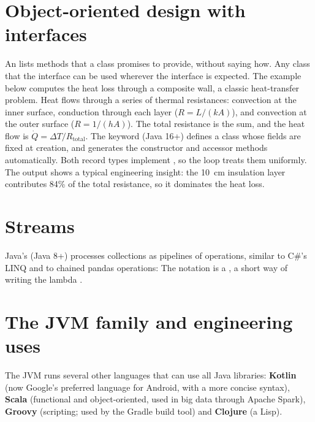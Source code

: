 \section{Object-oriented design with interfaces}

An  lists methods that a class promises to provide, without saying how.
Any class that  the interface can be used wherever the interface is
expected. The example below computes the heat loss through a composite wall, a classic
heat-transfer problem. Heat flows through a series of thermal resistances: convection at
the inner surface, conduction through each layer ($R = L/(kA)$), and convection at the
outer surface ($R = 1/(hA)$). The total resistance is the sum, and the heat flow is
$\dot Q = \Delta T / R_\mathrm{total}$.
The  keyword (Java 16+) defines a class whose fields are fixed at creation,
and generates the constructor and accessor methods automatically. Both record types
implement , so the loop treats them uniformly. The output shows a
typical engineering insight: the 10~cm insulation layer contributes 84\% of the total
resistance, so it dominates the heat loss.

\section{Streams}

Java's  (Java 8+) processes collections as pipelines of operations,
similar to C\#'s LINQ and to chained pandas operations:
The notation  is a , a short way of
writing the lambda .

\section{The JVM family and engineering uses}

The JVM runs several other languages that can use all Java libraries:
\textbf{Kotlin} (now Google's preferred language for Android, with a more concise
syntax), \textbf{Scala} (functional and object-oriented, used in big data through Apache
Spark), \textbf{Groovy} (scripting; used by the Gradle build tool) and \textbf{Clojure} (a
Lisp).

